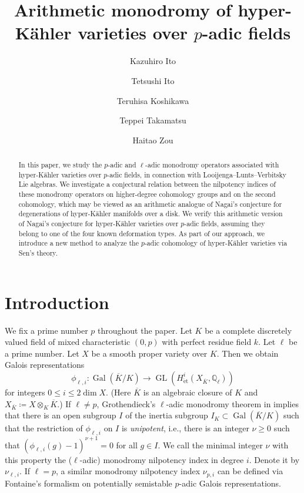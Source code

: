\documentclass[12pt,reqno]{amsart}
\title[Arithmetic monodromy of hyper-Kähler varieties over $p$-adic fields]{Arithmetic monodromy of hyper-Kähler varieties over $p$-adic fields}
\author[K.~Ito]{Kazuhiro Ito}
\author[T.~Ito]{Tetsushi Ito}
\author[T.~Koshikawa]{Teruhisa Koshikawa}
\author[T.~Takamatsu]{Teppei Takamatsu}
\author[H.~Zou]{Haitao Zou}
\theoremstyle{definition}
\newcommand{\Q}{{\mathds Q}}
\newcommand\Gal{\mathop{\mathrm{Gal}}\nolimits}
\newcommand\GL{\mathop{\mathrm{GL}}\nolimits}
\newcommand{\et}{\mathrm{\acute{e}t}}
\numberwithin{equation}{section}
\begin{document}
\begin{abstract}
In this paper, we study the $p$-adic and $\ell$-adic monodromy operators associated with hyper-Kähler varieties over $p$-adic fields, in connection with Looijenga--Lunts--Verbitsky Lie algebras.
We investigate a conjectural relation between the nilpotency indices of these monodromy operators on higher-degree cohomology groups and on the second cohomology, which may be viewed as an arithmetic analogue of Nagai’s conjecture for degenerations of hyper-Kähler manifolds over a disk. We verify this arithmetic version of Nagai’s conjecture for hyper-Kähler varieties over $p$-adic fields, assuming they belong to one of the four known deformation types.
As part of our approach, we introduce a new method to analyze the $p$-adic cohomology of hyper-Kähler varieties via Sen's theory.
\end{abstract}
\maketitle
\setcounter{tocdepth}{1}
\tableofcontents


\section{Introduction} \label{Section:Introduction}

We fix a prime number $p$ throughout the paper.
Let $K$ be a complete discretely valued field of mixed characteristic $(0, p)$ with perfect residue field $k$. Let $\ell$ be a prime number.
Let $X$ be a smooth proper variety over $K$. Then we obtain Galois representations
\[
\phi_{\ell,i}\colon \Gal (\overline{K}/K) \rightarrow \GL ( H^i_{\et} (X_{\overline{K}}, \Q_{\ell}))
\]
for integers $0 \leq i \leq 2 \dim X$.
(Here $\overline{K}$ is an algebraic closure of $K$ and $X_{\overline{K}}\coloneqq X \otimes_K \overline{K}$.)
If $\ell \neq p$, Grothendieck's $\ell$-adic monodromy theorem in \cite{SGA7-I} implies that there is an open subgroup $I$ of the inertia subgroup $I_K \subset \Gal(\overline{K}/K)$ such that the restriction of $\phi_{\ell,i}$ on $I$ is \emph{unipotent}, i.e., there is an integer $\nu \geq 0$ such that 
$(\phi_{\ell,i}(g) -1 )^{\nu+1} =0$ for all $g \in I$.
We call the minimal integer $\nu$ with this property the ($\ell$-adic) monodromy nilpotency index in degree $i$. Denote it by $\nu_{\ell, i}$. If $\ell =p$, a similar monodromy nilpotency index $\nu_{p, i}$ can be defined via Fontaine's formalism on potentially semistable $p$-adic Galois representations.
\end{document}
